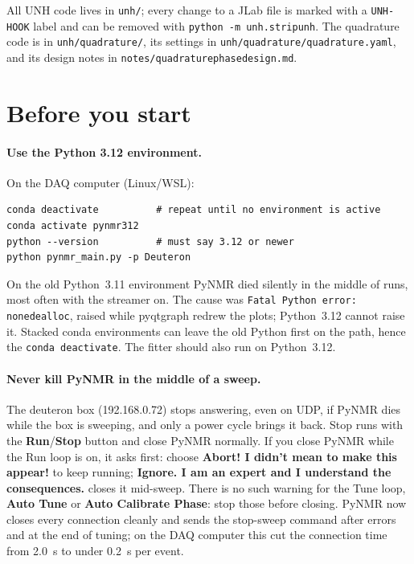 \documentclass[11pt]{article}
\newcommand{\code}[1]{\texttt{\begingroup\def\_{\textunderscore\allowbreak}#1\endgroup}}
\newcommand{\btn}[1]{\textsf{\textbf{#1}}}   %
\begin{document}
All UNH code lives in \code{unh/}; every change to a JLab file is marked with a \code{UNH-HOOK} label and
can be removed with \code{python -m unh.strip\_unh}. The quadrature code is in \code{unh/quadrature/},
its settings in \code{unh/quadrature/quadrature.yaml}, and its design notes in
\code{notes/quadrature\_phase\_design.md}.

\section{Before you start}
\label{sec:start}

\paragraph{Use the Python 3.12 environment.} On the DAQ computer (Linux/WSL):
\begin{verbatim}
conda deactivate          # repeat until no environment is active
conda activate pynmr312
python --version          # must say 3.12 or newer
python pynmr_main.py -p Deuteron
\end{verbatim}
On the old Python~3.11 environment PyNMR died silently in the middle of runs, most often with the
streamer on. The cause was \code{Fatal Python error: none\_dealloc}, raised while pyqtgraph redrew the plots;
Python~3.12 cannot raise it. Stacked conda environments can leave the old Python first on the path, hence
the \code{conda deactivate}. The fitter should also run on Python~3.12.

\paragraph{Never kill PyNMR in the middle of a sweep.} The deuteron box (192.168.0.72) stops answering, even
on UDP, if PyNMR dies while the box is sweeping, and only a power cycle brings it back. Stop runs with the
\btn{Run}/\btn{Stop} button and close PyNMR normally. If you close PyNMR while the Run loop is on, it asks first: choose
\btn{Abort! I didn't mean to make this appear!} to keep running; \btn{Ignore. I am an expert and I understand the
consequences.} closes it mid-sweep. There is no such warning for the Tune loop, \btn{Auto Tune} or
\btn{Auto Calibrate Phase}: stop those before closing. PyNMR now closes every connection cleanly and sends the
stop-sweep command after errors and at the end of tuning; on the DAQ computer this cut the connection time
from 2.0~s to under 0.2~s per event.
\end{document}
